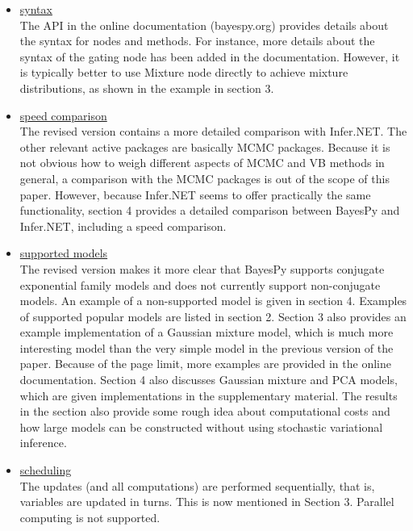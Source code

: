\documentclass{article}
\begin{document}
\begin{itemize}

\item \underline{syntax}
  \\
  The API in the online documentation (bayespy.org) provides details about the
  syntax for nodes and methods.  For instance, more details about the syntax of
  the gating node has been added in the documentation.  However, it is typically
  better to use Mixture node directly to achieve mixture distributions, as shown
  in the example in section 3.

\item \underline{speed comparison}
  \\
  The revised version contains a more detailed comparison with Infer.NET.  The
  other relevant active packages are basically MCMC packages.  Because it is not
  obvious how to weigh different aspects of MCMC and VB methods in general, a
  comparison with the MCMC packages is out of the scope of this paper.  However,
  because Infer.NET seems to offer practically the same functionality, section 4
  provides a detailed comparison between BayesPy and Infer.NET, including a
  speed comparison.

\item \underline{supported models}
  \\
  The revised version makes it more clear that BayesPy supports conjugate
  exponential family models and does not currently support non-conjugate models.
  An example of a non-supported model is given in section 4.  Examples of
  supported popular models are listed in section 2.  Section 3 also provides an
  example implementation of a Gaussian mixture model, which is much more
  interesting model than the very simple model in the previous version of the
  paper.  Because of the page limit, more examples are provided in the online
  documentation.  Section 4 also discusses Gaussian mixture and PCA models,
  which are given implementations in the supplementary material.  The results in
  the section also provide some rough idea about computational costs and how
  large models can be constructed without using stochastic variational
  inference.

\item \underline{scheduling}
  \\
  The updates (and all computations) are performed sequentially, that is,
  variables are updated in turns.  This is now mentioned in Section 3.  Parallel
  computing is not supported.

\end{itemize}
\end{document}
